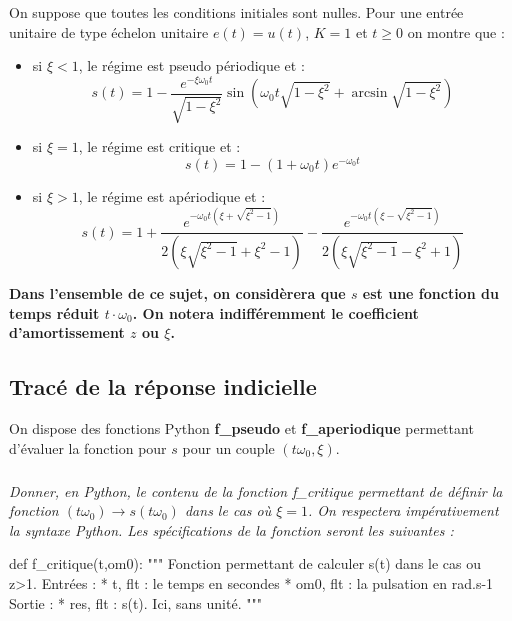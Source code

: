 \documentclass[10pt]{article}
\newif\ifprof
\begin{document}
\vspace{.5cm}

On suppose que toutes les conditions initiales sont nulles. Pour une entrée unitaire de type échelon unitaire $e(t)=u(t)$, $K=1$ et $t\geq0$ on montre que : 
\begin{itemize}
\item si $\xi <1$, le régime est pseudo périodique et :
$$
s(t)=1-\dfrac{e^{-\xi\omega_0 t}}{\sqrt{1-\xi^2}}\sin\left(  \omega_0 t\sqrt{1-\xi^2}+\arcsin \sqrt{1-\xi^2} \right)
$$
\item si $\xi=1$, le régime est critique et : 
$$
s(t)=1-\left(1+\omega_0 t \right)e^{-\omega_0 t} 
$$
\item si $\xi>1$, le régime est apériodique et : 
$$
s(t)=1
+\dfrac{e^{- \omega_0 t\left( \xi + \sqrt{\xi^2-1}\right)}}{2\left(\xi\sqrt{\xi^2-1}+\xi^2-1 \right)}
-\dfrac{e^{- \omega_0 t \left( \xi - \sqrt{\xi^2-1}\right)}}{2\left(\xi\sqrt{\xi^2-1}-\xi^2+1 \right)}
$$
\end{itemize} 

\begin{center}
\textbf{Dans l'ensemble de ce sujet, on considèrera que $s$ est une fonction du temps réduit $t\cdot\omega_0$. On notera indifféremment le coefficient d'amortissement $z$ ou $\xi$.}
\end{center}
\fi

\subsection*{Tracé de la réponse indicielle}
\ifprof
\else
On dispose des fonctions Python \textbf{\textsf{f\_pseudo}} et \textbf{\textsf{f\_aperiodique}} permettant d'évaluer la fonction pour $s$ pour un couple $(t\omega_0,\xi)$.
\fi

\subparagraph{} \textit{Donner, en Python, le contenu de la fonction \textsf{f\_critique} permettant de définir la fonction $(t\omega_0) \rightarrow s(t\omega_0)$ dans le cas où $\xi=1$. On respectera impérativement la syntaxe Python. Les spécifications de la fonction seront les suivantes : }
\begin{py}
\begin{python}
def f_critique(t,om0):
    """
    Fonction permettant de calculer s(t) dans le cas ou z>1. 
    Entrées :
        * t, flt : le temps en secondes
        * om0, flt : la pulsation en rad.s-1
    Sortie : 
        * res, flt : s(t). Ici, sans unité.
    """
\end{python}
\end{py}
\end{document}
